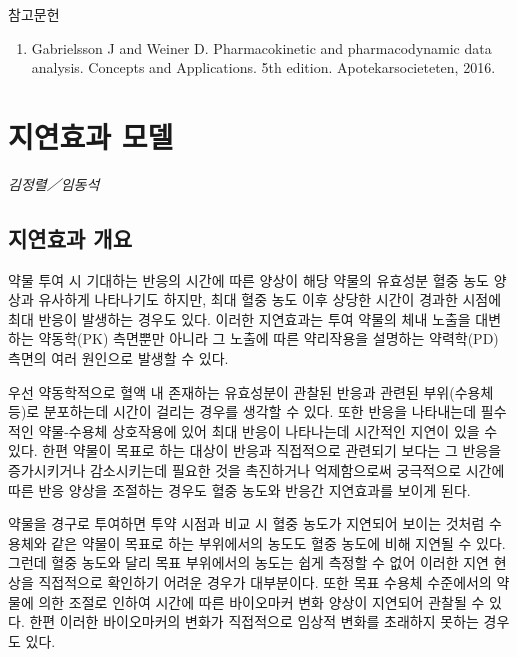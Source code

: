 \documentclass[
  10pt,
]{krantz}
\providecommand{\tightlist}{%
  \setlength{\itemsep}{0pt}\setlength{\parskip}{0pt}}
\begin{document}
참고문헌

\begin{enumerate}
\def\labelenumi{\arabic{enumi}.}
\tightlist
\item
  Gabrielsson J and Weiner D. Pharmacokinetic and pharmacodynamic data analysis. Concepts and Applications. 5th edition. Apotekarsocieteten, 2016.
\end{enumerate}

\hypertarget{uxc9c0uxc5f0uxd6a8uxacfc-uxbaa8uxb378}{%
\chapter{지연효과 모델}\label{uxc9c0uxc5f0uxd6a8uxacfc-uxbaa8uxb378}}

\emph{김정렬／임동석}

\hypertarget{uxc9c0uxc5f0uxd6a8uxacfc-uxac1cuxc694}{%
\section{지연효과 개요}\label{uxc9c0uxc5f0uxd6a8uxacfc-uxac1cuxc694}}

약물 투여 시 기대하는 반응의 시간에 따른 양상이 해당 약물의 유효성분 혈중 농도 양상과 유사하게 나타나기도 하지만, 최대 혈중
농도 이후 상당한 시간이 경과한 시점에 최대 반응이 발생하는 경우도 있다. 이러한 지연효과는 투여 약물의 체내 노출을 대변하는
약동학(PK) 측면뿐만 아니라 그 노출에 따른 약리작용을 설명하는 약력학(PD) 측면의 여러 원인으로 발생할 수 있다.

우선 약동학적으로 혈액 내 존재하는 유효성분이 관찰된 반응과 관련된 부위(수용체 등)로 분포하는데 시간이 걸리는 경우를 생각할 수
있다. 또한 반응을 나타내는데 필수적인 약물-수용체 상호작용에 있어 최대 반응이 나타나는데 시간적인 지연이 있을 수 있다. 한편
약물이 목표로 하는 대상이 반응과 직접적으로 관련되기 보다는 그 반응을 증가시키거나 감소시키는데 필요한 것을 촉진하거나
억제함으로써 궁극적으로 시간에 따른 반응 양상을 조절하는 경우도 혈중 농도와 반응간 지연효과를 보이게 된다.

약물을 경구로 투여하면 투약 시점과 비교 시 혈중 농도가 지연되어 보이는 것처럼 수용체와 같은 약물이 목표로 하는 부위에서의
농도도 혈중 농도에 비해 지연될 수 있다. 그런데 혈중 농도와 달리 목표 부위에서의 농도는 쉽게 측정할 수 없어 이러한
지연 현상을 직접적으로 확인하기 어려운 경우가 대부분이다. 또한 목표 수용체 수준에서의 약물에 의한 조절로 인하여 시간에 따른
바이오마커 변화 양상이 지연되어 관찰될 수 있다. 한편 이러한 바이오마커의 변화가 직접적으로 임상적 변화를 초래하지 못하는
경우도 있다.
\end{document}
